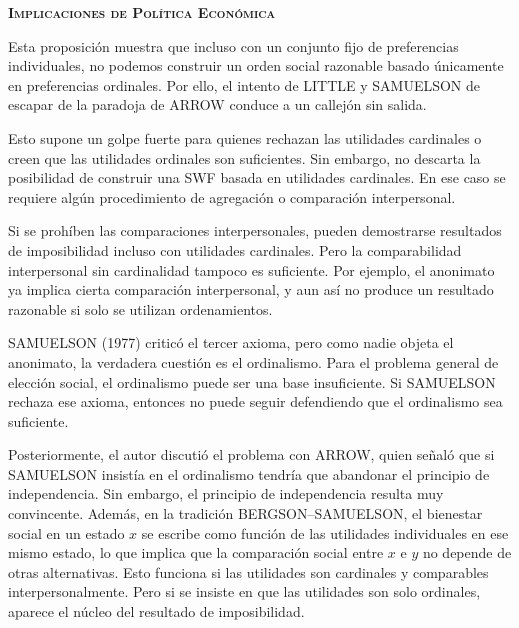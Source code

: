 \documentclass[10pt,a4paper]{article}
\begin{document}
\textbf{\textsc{Implicaciones de Política Económica}}

Esta proposición muestra que incluso con un conjunto fijo de preferencias individuales, no podemos construir un orden social razonable basado únicamente en preferencias ordinales. Por ello, el intento de LITTLE y SAMUELSON de escapar de la paradoja de ARROW conduce a un callejón sin salida.

Esto supone un golpe fuerte para quienes rechazan las utilidades cardinales o creen que las utilidades ordinales son suficientes. Sin embargo, no descarta la posibilidad de construir una SWF basada en utilidades cardinales. En ese caso se requiere algún procedimiento de agregación o comparación interpersonal.

Si se prohíben las comparaciones interpersonales, pueden demostrarse resultados de imposibilidad incluso con utilidades cardinales. Pero la comparabilidad interpersonal sin cardinalidad tampoco es suficiente. Por ejemplo, el anonimato ya implica cierta comparación interpersonal, y aun así no produce un resultado razonable si solo se utilizan ordenamientos.

SAMUELSON (1977) criticó el tercer axioma, pero como nadie objeta el anonimato, la verdadera cuestión es el ordinalismo. Para el problema general de elección social, el ordinalismo puede ser una base insuficiente. Si SAMUELSON rechaza ese axioma, entonces no puede seguir defendiendo que el ordinalismo sea suficiente.

Posteriormente, el autor discutió el problema con ARROW, quien señaló que si SAMUELSON insistía en el ordinalismo tendría que abandonar el principio de independencia. Sin embargo, el principio de independencia resulta muy convincente. Además, en la tradición BERGSON–SAMUELSON, el bienestar social en un estado $x$ se escribe como función de las utilidades individuales en ese mismo estado, lo que implica que la comparación social entre $x$ e $y$ no depende de otras alternativas. Esto funciona si las utilidades son cardinales y comparables interpersonalmente. Pero si se insiste en que las utilidades son solo ordinales, aparece el núcleo del resultado de imposibilidad.
\end{document}
